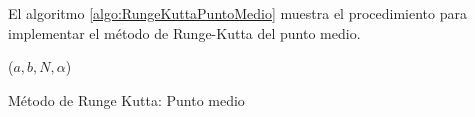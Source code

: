 El algoritmo \ref{algo:RungeKuttaPuntoMedio} muestra el procedimiento para implementar el método de Runge-Kutta del punto medio.

\begin{algorithm}[h]
	\rungekutta ($a,b,N,\alpha$) 
\caption{Método de Runge Kutta: Punto medio}
\label{algo:RungeKuttaPuntoMedio}
\end{algorithm}

